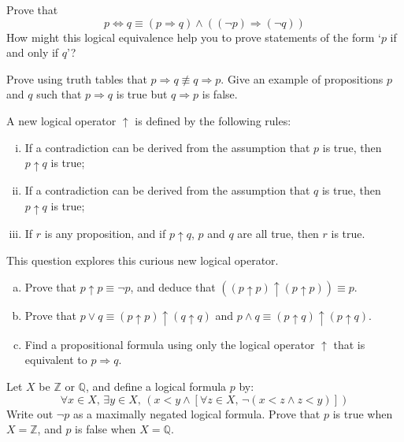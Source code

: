 \begin{chapex}
Prove that
\[
p \Leftrightarrow q \equiv (p \Rightarrow q) \wedge ((\neg p) \Rightarrow (\neg q))
\]
How might this logical equivalence help you to prove statements of the form `$p$ if and only if $q$'?
\end{chapex}

\begin{chapex}
Prove using truth tables that $p \Rightarrow q \not\equiv q \Rightarrow p$. Give an example of propositions $p$ and $q$ such that $p \Rightarrow q$ is true but $q \Rightarrow p$ is false.
\end{chapex}

\begin{chapex}
A new logical operator $\uparrow$ is defined by the following rules:
\begin{enumerate}[(i)]
\item If a contradiction can be derived from the assumption that $p$ is true, then $p \uparrow q$ is true;
\item If a contradiction can be derived from the assumption that $q$ is true, then $p \uparrow q$ is true;
\item If $r$ is any proposition, and if $p \uparrow q$, $p$ and $q$ are all true, then $r$ is true.
\end{enumerate}

This question explores this curious new logical operator.
\begin{enumerate}[(a)]
\item Prove that $p \uparrow p \equiv \neg p$, and deduce that $((p \uparrow p) \uparrow (p \uparrow p)) \equiv p$.
\item Prove that $p \vee q \equiv (p \uparrow p) \uparrow (q \uparrow q)$ and $p \wedge q \equiv (p \uparrow q) \uparrow (p \uparrow q)$.
\item Find a propositional formula using only the logical operator $\uparrow$ that is equivalent to $p \Rightarrow q$.
\end{enumerate}
\end{chapex}

\begin{chapex}
Let $X$ be $\mathbb{Z}$ or $\mathbb{Q}$, and define a logical formula $p$ by:
$$\forall x \in X,\, \exists y \in X,\, (x<y \wedge [\forall z \in X,\, \neg (x<z \wedge z<y)])$$
Write out $\neg p$ as a maximally negated logical formula. Prove that $p$ is true when $X = \mathbb{Z}$, and $p$ is false when $X = \mathbb{Q}$.
\end{chapex}

